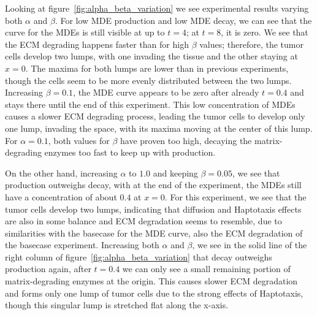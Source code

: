 Looking at figure~\ref{fig:alpha_beta_variation} we see experimental results varying both $\alpha$ and $\beta$. For low MDE production and low MDE decay, we can see that the curve for the MDEs is still visible at up to $t=4$; at $t=8$, it is zero. We see that the ECM degrading happens faster than for high $\beta$ values; therefore, the tumor cells develop two lumps, with one invading the tissue and the other staying at $x=0$. The maxima for both lumps are lower than in previous experiments, though the cells seem to be more evenly distributed between the two lumps. Increasing $\beta=0.1$, the MDE curve appears to be zero after already $t=0.4$ and stays there until the end of this experiment. This low concentration of MDEs causes a slower ECM degrading process, leading the tumor cells to develop only one lump, invading the space, with its maxima moving at the center of this lump. For $\alpha=0.1$, both values for $\beta$ have proven too high, decaying the matrix-degrading enzymes too fast to keep up with production.

On the other hand, increasing $\alpha$ to $1.0$ and keeping $\beta=0.05$, we see that production outweighs decay, with at the end of the experiment, the MDEs still have a concentration of about $0.4$ at $x=0$. For this experiment, we see that the tumor cells develop two lumps, indicating that diffusion and Haptotaxis effects are also in some balance and ECM degradation seems to resemble, due to similarities with the basecase for the MDE curve, also the ECM degradation of the basecase experiment.
Increasing both $\alpha$ and $\beta$, we see in the solid line of the right column of figure~\ref{fig:alpha_beta_variation} that decay outweighs production again, after $t=0.4$ we can only see a small remaining portion of matrix-degrading enzymes at the origin. This causes slower ECM degradation and forms only one lump of tumor cells due to the strong effects of Haptotaxis, though this singular lump is stretched flat along the x-axis.


